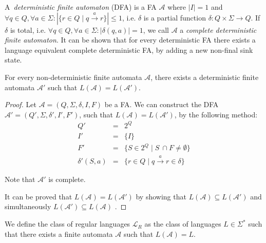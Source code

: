 A~\emph{deterministic finite automaton} (DFA) is a FA $\mathcal{A}$ where $|I| =
1$ and $\forall q \in Q, \forall a \in \Sigma: |\{ r \in Q \mid q
\overset{a}{\longrightarrow} r\}| \leq 1$, i.e. $\delta$ is a partial function
$\delta : Q \times \Sigma \longrightarrow Q$. If $\delta$ is total, i.e.
$\forall q \in Q, \forall a \in \Sigma : |\delta(q, a)| = 1$, we call
$\mathcal{A}$ a \emph{complete deterministic finite automaton}. It can be shown
that for every deterministic FA there exists a language equivalent complete
deterministic FA, by adding a new non-final sink state.
	
	\begin{lemma}
For every non-deterministic finite automata $\mathcal{A}$, there exists a
deterministic finite automata $\mathcal{A}'$ such that $L(\mathcal{A}) =
L(\mathcal{A}')$.
	\end{lemma}
	
	\begin{proof}
	Let $\mathcal{A} = (Q, \Sigma, \delta, I, F)$ be a FA. We can construct
	the DFA $\mathcal{A}'= (Q', \Sigma, \delta', I', F')$, such that
	$L(\mathcal{A}) = L(\mathcal{A}')$, by the following method:
	\begin{eqnarray*}
	 Q' & = & 2^Q\\
	 I' & = & \{I\}\\
	 F' & = & \{S \in 2^Q \mid S~\cap F \neq \emptyset\}\\
	 \delta'(S, a) & = & \{r \in Q \mid q \overset{a}{\longrightarrow} r \in
	 \delta\}
	\end{eqnarray*}
	
	Note that $\mathcal{A}'$ is complete.
	
	It can be proved that $L(\mathcal{A}) = L(\mathcal{A}')$ by showing that
	$L(\mathcal{A}) \subseteq L(\mathcal{A}')$ and simultaneously $L(\mathcal{A}')
	\subseteq L(\mathcal{A})$ \cite{tin}.
	\end{proof}
	
	\begin{defz}
We define the class of regular languages $\mathcal{L}_R$ as the class of
languages $L \in \Sigma^*$ such that there exists a finite automata
$\mathcal{A}$ such that $L(\mathcal{A}) = L$.
	\end{defz}
	
